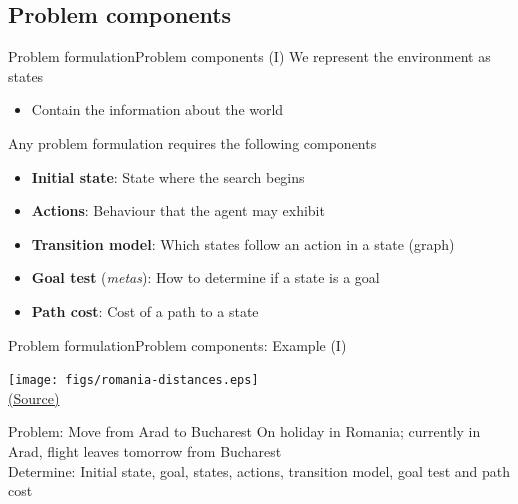 \documentclass[10pt,compress]{beamer} %
\begin{document}
\subsection{Problem components}
\begin{frame}{Problem formulation}{Problem components (I)}
    We represent the environment as \alert{states}
        \begin{itemize}
            \item Contain the information about the world
        \end{itemize}
    Any problem formulation requires the following components
	\begin{itemize}
        \item \textbf{Initial state}: State where the search begins
        \item \textbf{Actions}: Behaviour that the agent may exhibit
        \item \textbf{Transition model}: Which states follow an action in a state (\alert{graph})
        \item \textbf{Goal test} (\textit{metas}): How to determine if a state is a goal
        \item \textbf{Path cost}: Cost of a path to a state
	\end{itemize}
\end{frame}

\begin{frame}{Problem formulation}{Problem components: Example (I)}
    \begin{center}
	    \texttt{[image: figs/romania-distances.eps]}\\
	    \tiny{\href{http://aima.cs.berkeley.edu/index.html}{(Source)}}
	\end{center}

    \begin{exampleblock}{Problem: Move from Arad to Bucharest}
        On holiday in Romania; currently in Arad, flight leaves tomorrow from Bucharest\\
        Determine: Initial state, goal, states, actions, transition model, goal test and path cost
    \end{exampleblock}
\end{frame}
\end{document}
